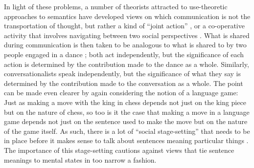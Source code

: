In light of these problems, a number of theorists attracted to use-theoretic approaches to semantics have developed views on which communication is not the transportation of thought, but rather a kind of ``joint action'' \citep{Clark:1996}, or a co-operative activity that involves navigating between two social perspectives \citep{Brandom:1994}. What is shared during communication is then taken to be analogous to what is shared to by two people engaged in a dance \citep{Clark:1996,Brandom:2010a}; both act independently, but the significance of each action is determined by the contribution made to the dance as a whole. Similarly, conversationalists speak independently, but the significance of what they say is determined by the contribution made to the conversation as a whole. The point can be made even clearer by again considering the notion of a language game: Just as making a move with the king in chess depends not just on the king piece but on the nature of chess, so too is it the case that making a move in a language game depends not just on the sentence used to make the move but on the nature of the game itself. As such, there is a lot of ``social stage-setting'' that needs to be in place before it makes sense to talk about sentences meaning particular things \citep[][p. 461]{Brandom:1994}. The importance of this stage-setting cautions against views that tie sentence meanings to mental states in too narrow a fashion. 

